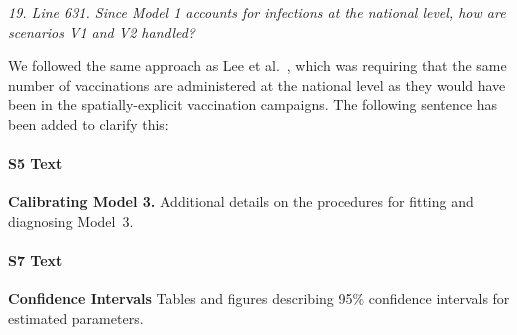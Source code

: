\documentclass[11pt]{article}
\newcommand\report[1]{{\color{mygreen} \vspace{1mm}\hspace{0.25in}\parbox{6in}{\em #1}}}
\newcommand\article[1]{{\color{blue} \vspace{1mm}\hspace{0.25in}\parbox{6in}{\em #1}}}
\begin{document}
\report{
  19. Line 631. Since Model 1 accounts for infections at the national level, how are scenarios V1 and V2 handled?
}

We followed the same approach as Lee et al.~\cite{lee20}, which was requiring that the same number of vaccinations are administered at the national level as they would have been in the spatially-explicit vaccination campaigns.
The following sentence has been added to clarify this:

\article{\editModVacc}



\paragraph*{S5 Text}
\label{S_mod3cal}
{\bf Calibrating Model 3.} Additional details on the procedures for fitting and diagnosing Model~3.

\paragraph*{S7 Text}
\label{S_CI}
{\bf Confidence Intervals} Tables and figures describing 95\% confidence intervals for estimated parameters.
\end{document}
